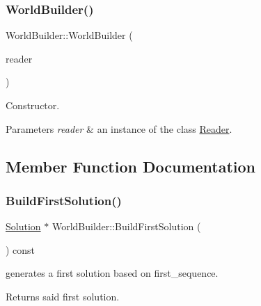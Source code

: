 \subsubsection{\texorpdfstring{World\+Builder()}{WorldBuilder()}}
{\footnotesize\ttfamily World\+Builder\+::\+World\+Builder (\begin{DoxyParamCaption}\item[{\hyperlink{classReader}{Reader} $\ast$}]{reader }\end{DoxyParamCaption})}



Constructor. 


\begin{DoxyParams}{Parameters}
{\em reader} & an instance of the class \hyperlink{classReader}{Reader}. \\
\hline
\end{DoxyParams}


\subsection{Member Function Documentation}
\mbox{\label{classWorldBuilder_a1ced8bec93da65ab264264a2c6a380e9}} 
\subsubsection{\texorpdfstring{Build\+First\+Solution()}{BuildFirstSolution()}}
{\footnotesize\ttfamily \hyperlink{classSolution}{Solution} $\ast$ World\+Builder\+::\+Build\+First\+Solution (\begin{DoxyParamCaption}{ }\end{DoxyParamCaption}) const}



generates a first solution based on first\+\_\+sequence. 

\begin{DoxyReturn}{Returns}
said first solution. 
\end{DoxyReturn}
\mbox{\label{classWorldBuilder_a128c41fff6a87b5c9dbff6d43e9bc747}} 
